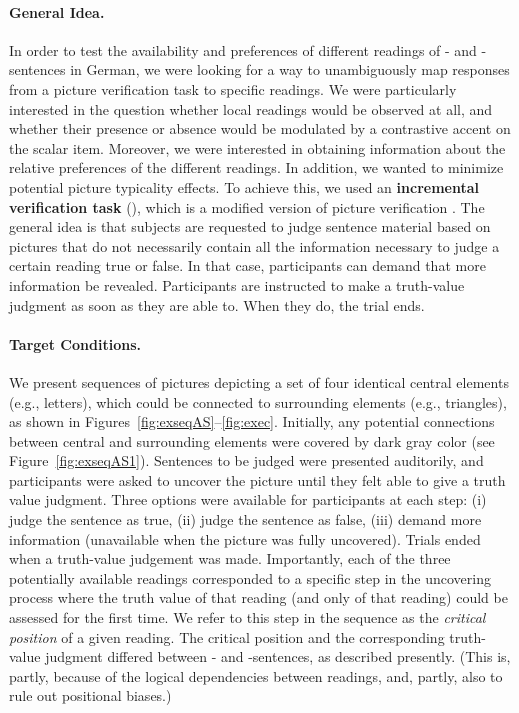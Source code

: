 \documentclass[fleqn,reqno,10pt,draft]{article}
\newcommand{\as}{\acro{as}}
\renewcommand{\es}{\acro{es}}
\renewcommand{\mymark}[1]{\textbf{#1}}
\begin{document}
\paragraph{General Idea.} In order to test the availability and
preferences of different readings of \as- and \es-sentences in German,
we were looking for a way to unambiguously map responses from a
picture verification task to specific readings. We were particularly
interested in the question whether local readings would be observed at
all, and whether their presence or absence would be modulated by a
contrastive accent on the scalar item. Moreover, we were interested in
obtaining information about the relative preferences of the different
readings. In addition, we wanted to minimize potential picture
typicality effects. To achieve this, we used an \mymark{incremental
  verification task} (), which is a modified version of
picture verification \citep[see][]{Conroy2008}. The general idea is
that subjects are requested to judge sentence material based on
pictures that do not necessarily contain all the information necessary
to judge a certain reading true or false. In that case, participants
can demand that more information be revealed. Participants are
instructed to make a truth-value judgment as soon as they are able
to. When they do, the trial ends.

\paragraph{Target Conditions.} We present sequences of pictures
depicting a set of four identical central elements (e.g., letters),
which could be connected to surrounding elements (e.g., triangles), as
shown in Figures~\ref{fig:exseqAS}--\ref{fig:exec}. Initially,
any potential connections between central and surrounding elements
were covered by dark gray color (see
Figure~\ref{fig:exseqAS1}). Sentences to be judged were presented
auditorily, and participants were asked to uncover the picture until
they felt able to give a truth value judgment. Three options were
available for participants at each step: (i) judge the sentence as
true, (ii) judge the sentence as false, (iii) demand more information
(unavailable when the picture was fully uncovered). Trials ended when
a truth-value judgement was made. Importantly, each of the three
potentially available readings corresponded to a specific step in the
uncovering process where the truth value of that reading (and only of
that reading) could be assessed for the first time. We refer to this
step in the sequence as the {\it critical position} of a given
reading. The critical position and the corresponding truth-value
judgment differed between \as- and \es-sentences, as described
presently. (This is, partly, because of the logical dependencies
between readings, and, partly, also to rule out positional biases.)
\end{document}
